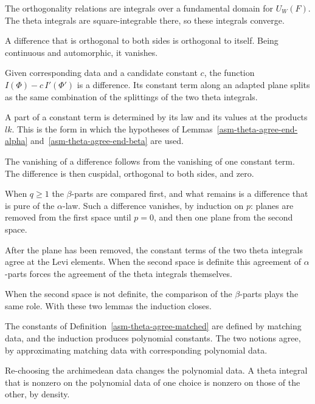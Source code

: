The orthogonality relations are integrals over a fundamental domain for
$U_W(F)$. The theta integrals are square-integrable there, so these integrals
converge.

A difference that is orthogonal to both sides is orthogonal to itself. Being
continuous and automorphic, it vanishes.

Given corresponding data and a candidate constant $c$, the function
$I(\Phi)-c\,I'(\Phi')$ is a difference. Its constant term along an adapted
plane splits as the same combination of the splittings of the two theta
integrals.

A part of a constant term is determined by its law and its values at the
products $lk$. This is the form in which the hypotheses of
Lemmas~\ref{asm-theta-agree-end-alpha} and~\ref{asm-theta-agree-end-beta} are
used.

The vanishing of a difference follows from the vanishing of one constant term.
The difference is then cuspidal, orthogonal to both sides, and zero.

When $q\geq1$ the $\beta$-parts are compared first, and what remains is a
difference that is pure of the $\alpha$-law. Such a difference vanishes, by
induction on $p$: planes are removed from the first space until $p=0$, and then
one plane from the second space.

After the plane has been removed, the constant terms of the two theta
integrals agree at the Levi elements. When the second space is definite this
agreement of $\alpha$-parts forces the agreement of the theta integrals
themselves.

When the second space is not definite, the comparison of the $\beta$-parts
plays the same role. With these two lemmas the induction closes.

The constants of Definition~\ref{asm-theta-agree-matched} are defined by
matching data, and the induction produces polynomial constants. The two
notions agree, by approximating matching data with corresponding polynomial
data.

Re-choosing the archimedean data changes the polynomial data. A theta integral
that is nonzero on the polynomial data of one choice is nonzero on those of
the other, by density.

